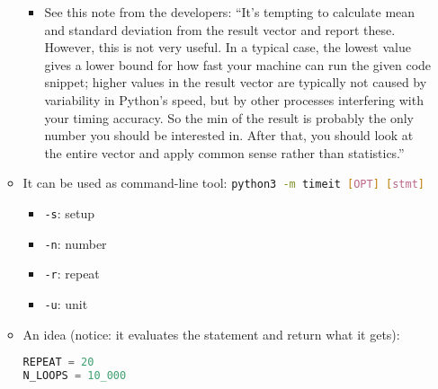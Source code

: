 \documentclass[a4paper,12pt,%
              final%
              ]{article}
\begin{document}
\begin{itemize}
\begin{itemize}
\begin{itemize}
          \item See this note from the developers: ``It’s tempting to calculate mean and standard deviation from the result vector and report these. However, this is not very useful. In a typical case, the lowest value gives a lower bound for how fast your machine can run the given code snippet; higher values in the result vector are typically not caused by variability in Python’s speed, but by other processes interfering with your timing accuracy. So the min of the result is probably the only number you should be interested in. After that, you should look at the entire vector and apply common sense rather than statistics.''
        \end{itemize}
      \item It can be used as command-line tool: \lstinline[language=bash]{python3 -m timeit [OPT] [stmt]}
        \begin{itemize}
          \item \verb|-s|: setup
          \item \verb|-n|: number
          \item \verb|-r|: repeat
          \item \verb|-u|: unit
        \end{itemize}
      \item An idea (notice: it evaluates the statement and return what it gets):
\begin{lstlisting}[language=python]
REPEAT = 20
N_LOOPS = 10_000


\end{lstlisting}
\end{itemize}
\end{itemize}
\end{document}
